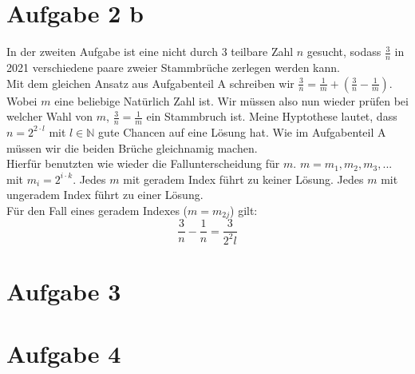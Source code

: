 \documentclass{article}
\begin{document}
\section*{Aufgabe 2 b}
In der zweiten Aufgabe ist eine nicht durch 3 teilbare Zahl \(n\) gesucht, 
sodass \(\frac{3}{n}\) in 2021 verschiedene paare zweier Stammbrüche zerlegen werden kann.\\
Mit dem gleichen Ansatz aus Aufgabenteil A schreiben wir \(\frac{3}{n} = \frac{1}{m} + (\frac{3}{n} - \frac{1}{m})\). 
Wobei \(m\) eine beliebige Natürlich Zahl ist. Wir müssen also nun wieder prüfen bei welcher Wahl von \(m\), 
\(\frac{3}{n} = \frac{1}{m}\) ein Stammbruch ist. Meine Hyptothese lautet, dass \(n = 2^{2 \cdot l}\) mit \(l \in \mathbb{N}\) 
gute Chancen auf eine Lösung hat. Wie im Aufgabenteil A müssen wir die beiden Brüche gleichnamig machen.\\
Hierfür benutzten wie wieder die Fallunterscheidung für $m$. \(m = m_1, m_2, m_3, ...\) mit \(m_i = 2^{i \cdot k}\). Jedes $m$ mit geradem Index führt zu keiner Lösung. Jedes $m$ mit ungeradem Index führt zu einer Lösung.\\
Für den Fall eines geradem Indexes ($m = m_{2j}$) gilt:
\begin{equation}
    \frac{3}{n} - \frac{1}{n} = \frac{3}{2^2l} 
\end{equation}
\section*{Aufgabe 3}
\section*{Aufgabe 4}
\end{document}
